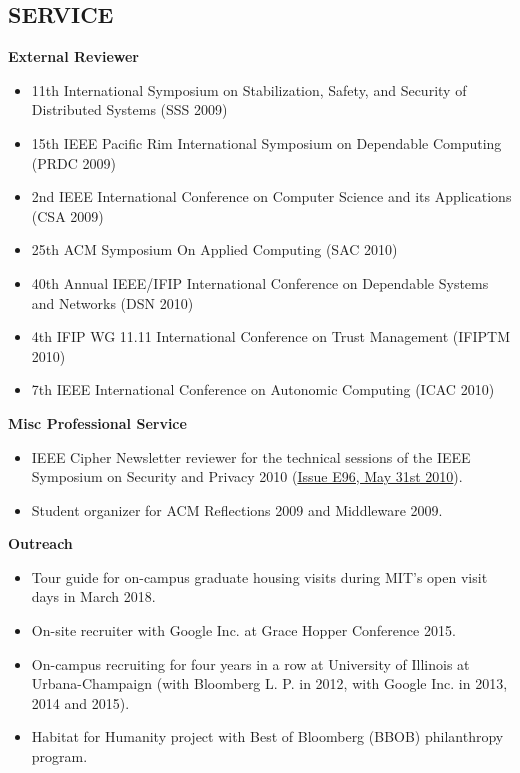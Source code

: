 \documentclass[line,margin]{res}
\begin{document}
\begin{resume}
\section{SERVICE}
	       \textbf{External Reviewer}
                \begin{itemize}  \itemsep -2pt	       
                \item 11th International Symposium on Stabilization, Safety, and Security of Distributed Systems (SSS 2009)
                \item15th IEEE Pacific Rim International Symposium on Dependable Computing (PRDC 2009)
                \item 2nd IEEE International Conference on Computer Science and its Applications (CSA 2009)
                \item 25th ACM Symposium On Applied Computing (SAC 2010)
                \item 40th Annual IEEE/IFIP International Conference on Dependable Systems and Networks (DSN 2010) 
                \item 4th IFIP WG 11.11 International Conference on Trust Management (IFIPTM 2010)
                \item 7th IEEE International Conference on Autonomic Computing (ICAC 2010)
                \end{itemize}
                \textbf{Misc Professional Service}
                \begin{itemize}  \itemsep -2pt
               \item IEEE Cipher Newsletter reviewer for the technical sessions of the IEEE Symposium on Security and Privacy 2010 (\href{http://www.ieee-security.org/Cipher/PastIssues/2010/E96.May-2010/E96.May-2010.html}{Issue E96, May 31st 2010}).
               \item Student organizer for ACM Reflections 2009 and Middleware 2009.
               \end{itemize}   
               \textbf{Outreach}
               \begin{itemize}  \itemsep -2pt
              \item Tour guide for on-campus graduate housing visits during MIT's open visit days in March 2018.
              \item On-site recruiter with Google Inc. at Grace Hopper Conference 2015.
	      \item On-campus recruiting for four years in a row at University of Illinois at Urbana-Champaign (with Bloomberg L. P. in 2012, with Google Inc. in 2013, 2014 and 2015).
	      \item Habitat for Humanity project with Best of Bloomberg (BBOB) philanthropy program.

\end{itemize}
\end{resume}
\end{document}
